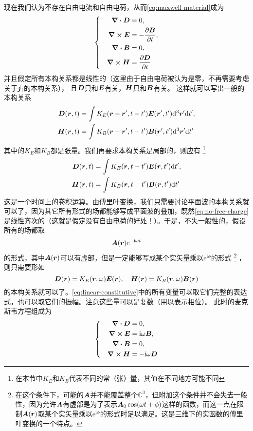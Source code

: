 \documentclass[UTF8, a4paper]{ctexart}
\newcommand*{\ii}{\mathrm{i}}
\newcommand*{\ee}{\mathrm{e}}
\newcommand*{\complexes}{\mathbb{C}}
\newenvironment{bigcase}{\left\{\quad\begin{aligned}}{\end{aligned}\right.}
\begin{document}
现在我们认为不存在自由电流和自由电荷，从而\eqref{eq:maxwell-material}成为
\begin{equation}
    \begin{bigcase}
        \div{\vb*{D}} &= 0, \\
        \curl{\vb*{E}} &= - \pdv{\vb*{B}}{t}, \\
        \div{\vb*{B}} &= 0, \\
        \curl{\vb*{H}} &= \pdv{\vb*{D}}{t}
    \end{bigcase}
    \label{eq:no-free-charge}
\end{equation}
并且假定所有本构关系都是线性的（这里由于自由电荷被认为是零，不再需要考虑关于$\vb*{j}_\text{f}$的本构关系），
且$\vb*{D}$只和$\vb*{E}$有关，$\vb*{H}$只和$\vb*{B}$有关。
这样就可以写出一般的本构关系
\[
    \begin{split}
        \vb*{D}(\vb*{r}, t) &= \int K_E(\vb*{r} - \vb*{r}', t - t') \vb*{E}(\vb*{r}', t') \dd^3 \vb*{r}' \dd t', \\
        \vb*{H}(\vb*{r}, t) &= \int K_B(\vb*{r} - \vb*{r}', t - t') \vb*{B}(\vb*{r}', t') \dd^3 \vb*{r}' \dd t'
    \end{split}
\]
其中的$K_E$和$K_B$都是张量。我们再要求本构关系是局部的，则应有%
\footnote{在本节中$K_E$和$K_B$代表不同的常（张）量，其值在不同地方可能不同}
\[
    \begin{split}
        \vb*{D}(\vb*{r}, t) &= \int K_E(\vb*{r}, t-t') \vb*{E}(\vb*{r}, t') \dd t', \\
        \vb*{H}(\vb*{r}, t) &= \int K_B(\vb*{r}, t-t') \vb*{B}(\vb*{r}, t') \dd t'
    \end{split}
\]
这是一个时间上的卷积运算。由傅里叶变换，我们只需要讨论平面波的本构关系就可以了，因为其它所有形式的场都能够写成平面波的叠加，既然\eqref{eq:no-free-charge}是线性齐次的（这就是假定没有自由电荷的好处！）。于是，不失一般性的，假设所有的场都取
\[
    \vb*{A}(\vb*{r}) \ee^{-\ii \omega t}
\]
的形式，其中$\vb*{A}(\vb*{r})$可以有虚部，但是一定能够写成某个实矢量乘以$\ee^{\ii \phi}$的形式%
\footnote{在这个条件下，可能的$\vb*{A}$并不能覆盖整个$\complexes^3$，但附加这个条件并不会失去一般性，因为允许$\vb*{A}$有虚部是为了表示$\vb*{A}_0 \cos (\omega t + \phi)$这样的函数，而这一点在限制$\vb*{A}(\vb*{r})$取某个实矢量乘以$\ee^{\ii \phi}$的形式时足以满足。这是三维下的实函数的傅里叶变换的一个特点。}
，则只需要形如
\begin{equation}
    \vb*{D}(\vb*{r}) = K_E(\vb*{r}, \omega) \vb*{E}(\vb*{r}), \quad \vb*{H}(\vb*{r}) = K_B(\vb*{r}, \omega) \vb*{B}(\vb*{r})
    \label{eq:linear-constitutive}
\end{equation}
的本构关系就可以了。\eqref{eq:linear-constitutive}中的所有变量可以取它们完整的表达式，也可以取它们的振幅。注意这些量可以是复数（用以表示相位）。
此时的麦克斯韦方程组成为
\begin{equation}
    \begin{bigcase}
        \div{\vb*{D}} &= 0, \\
        \curl{\vb*{E}} &= \ii \omega \vb*{B}, \\
        \div{\vb*{B}} &= 0, \\
        \curl{\vb*{H}} &= - \ii \omega \vb*{D}
    \end{bigcase}
    \label{eq:sin-wave-eqs}
\end{equation}
\end{document}
